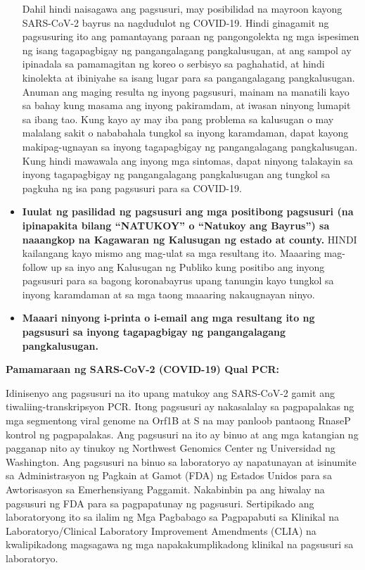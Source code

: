 \documentclass[10pt]{article}
\begin{document}
\begin{itemize}
  Dahil hindi naisagawa ang pagsusuri, may posibilidad na mayroon kayong
  SARS-CoV-2 bayrus na nagdudulot ng COVID-19.  Hindi ginagamit ng pagsusuring
  ito ang pamantayang paraan ng pangongolekta ng mga ispesimen ng isang
  tagapagbigay ng pangangalagang pangkalusugan, at ang sampol ay ipinadala sa
  pamamagitan ng koreo o serbisyo sa paghahatid, at hindi kinolekta at ibiniyahe
  sa isang lugar para sa pangangalagang pangkalusugan.  Anuman ang maging
  resulta ng inyong pagsusuri, mainam na manatili kayo sa bahay kung masama ang
  inyong pakiramdam, at iwasan ninyong lumapit sa ibang tao. Kung kayo ay may
  iba pang problema sa kalusugan o may malalang sakit o nababahala tungkol sa
  inyong karamdaman, dapat kayong makipag-ugnayan sa inyong tagapagbigay ng
  pangangalagang pangkalusugan.  Kung hindi mawawala ang inyong mga sintomas,
  dapat ninyong talakayin sa inyong tagapagbigay ng pangangalagang pangkalusugan
  ang tungkol sa pagkuha ng isa pang pagsusuri para sa COVID-19.

\item

  \textbf{Iuulat ng pasilidad ng pagsusuri ang mga positibong pagsusuri (na
  ipinapakita bilang “NATUKOY” o “Natukoy ang Bayrus”) sa naaangkop na Kagawaran
  ng Kalusugan ng estado at county.} HINDI kailangang kayo mismo ang mag-ulat sa
  mga resultang ito.  Maaaring mag-follow up sa inyo ang Kalusugan ng Publiko
  kung positibo ang inyong pagsusuri para sa bagong koronabayrus upang tanungin
  kayo tungkol sa inyong karamdaman at sa mga taong maaaring nakaugnayan ninyo.

\item

  \textbf{Maaari ninyong i-printa o i-email ang mga resultang ito ng pagsusuri
  sa inyong tagapagbigay ng pangangalagang pangkalusugan.}

\end{itemize}

\bigskip
\textbf{Pamamaraan ng SARS-CoV-2 (COVID-19) Qual PCR:}

Idinisenyo ang pagsusuri na ito upang matukoy ang SARS-CoV-2 gamit ang
tiwaliing-transkripsyon PCR. Itong pagsusuri ay nakasalalay sa pagpapalakas ng
mga segmentong viral genome na Orf1B at S na may panloob pantaong RnaseP kontrol
ng pagpapalakas. Ang pagsusuri na ito ay binuo at ang mga katangian ng pagganap
nito ay tinukoy ng Northwest Genomics Center ng Universidad ng Washington. Ang
pagsusuri na binuo sa laboratoryo ay napatunayan at isinumite sa Administrasyon
ng Pagkain at Gamot (FDA) ng Estados Unidos para sa Awtorisasyon sa
Emerhensiyang Paggamit. Nakabinbin pa ang hiwalay na pagsusuri ng FDA para sa
pagpapatunay ng pagsusuri. Sertipikado ang laboratoryong ito sa ilalim ng Mga
Pagbabago sa Pagpapabuti sa Klinikal na Laboratoryo/Clinical Laboratory
Improvement Amendments (CLIA) na kwalipikadong magsagawa ng mga
napakakumplikadong klinikal na pagsusuri sa laboratoryo.
\end{document}
